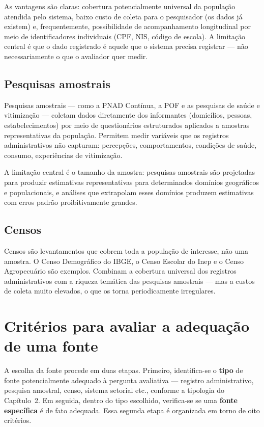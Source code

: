 As vantagens são claras: cobertura potencialmente universal da população atendida pelo sistema, baixo custo de coleta para o pesquisador (os dados já existem) e, frequentemente, possibilidade de acompanhamento longitudinal por meio de identificadores individuais (CPF, NIS, código de escola). A limitação central é que o dado registrado é aquele que o sistema precisa registrar --- não necessariamente o que o avaliador quer medir.

\subsection{Pesquisas amostrais}

Pesquisas amostrais --- como a PNAD Contínua, a POF e as pesquisas de saúde e vitimização --- coletam dados diretamente dos informantes (domicílios, pessoas, estabelecimentos) por meio de questionários estruturados aplicados a amostras representativas da população. Permitem medir variáveis que os registros administrativos não capturam: percepções, comportamentos, condições de saúde, consumo, experiências de vitimização.

A limitação central é o tamanho da amostra: pesquisas amostrais são projetadas para produzir estimativas representativas para determinados domínios geográficos e populacionais, e análises que extrapolam esses domínios produzem estimativas com erros padrão proibitivamente grandes.

\subsection{Censos}

Censos são levantamentos que cobrem toda a população de interesse, não uma amostra. O Censo Demográfico do IBGE, o Censo Escolar do Inep e o Censo Agropecuário são exemplos. Combinam a cobertura universal dos registros administrativos com a riqueza temática das pesquisas amostrais --- mas a custos de coleta muito elevados, o que os torna periodicamente irregulares.

\section{Critérios para avaliar a adequação de uma fonte}

A escolha da fonte procede em duas etapas. Primeiro, identifica-se o \textbf{tipo} de fonte potencialmente adequado à pergunta avaliativa --- registro administrativo, pesquisa amostral, censo, sistema setorial etc., conforme a tipologia do Capítulo~2. Em seguida, dentro do tipo escolhido, verifica-se se uma \textbf{fonte específica} é de fato adequada. Essa segunda etapa é organizada em torno de oito critérios.

